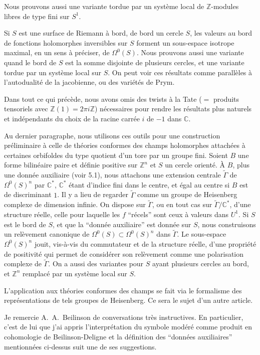 \documentclass[12pt,a4paper]{article}
\theoremstyle{plain}
\theoremstyle{definition}
\theoremstyle{remark}
\newcommand{\Z}{\mathbb{Z}}
\newcommand{\C}{\mathbb{C}}
\begin{document}
Nous prouvons aussi une variante tordue par un système local de $\Z$-modules libres de
type fini sur $S^1$.

Si $S$ est une surface de Riemann à bord, de bord un cercle $S$, les valeurs au bord
de fonctions holomorphes inversibles sur $S$ forment un sous-espace isotrope maximal,
en un sens à préciser, de $\Omega^0(S)$. Nous prouvons aussi une variante quand le bord de $S$
est la somme disjointe de plusieurs cercles, et une variante tordue par un système local
sur $S$. On peut voir ces résultats comme parallèles à l'autodualité de la jacobienne,
ou des variétés de Prym.

Dans tout ce qui précède, nous avons omis des twists à la Tate ($= {}$ produits tensoriels
avec $\Z(1) = 2\pi i\Z$) nécessaires pour rendre les résultats plus naturels et indépendants
du choix de la racine carrée $i$ de $-1$ dans $\C$.

Au dernier paragraphe, nous utilisons ces outils pour une construction préliminaire
à celle de théories conformes des champs holomorphes attachées à certaines orbifoldes
du type quotient d'un tore par un groupe fini. Soient $B$ une forme bilinéaire paire et
définie positive sur $\Z^n$ et $S$ un cercle orienté. À $B$, plus une donnée auxiliaire (voir 5.1),
nous attachons une extension centrale $\tilde{\Gamma}$ de $\Omega^0(S)^n$ par $\C^*$, $\C^*$ étant d'indice fini dans
le centre, et égal au centre si $B$ est de discriminant $1$. Il y a lieu de regarder $\tilde{\Gamma}$ comme
un groupe de Heisenberg complexe de dimension infinie. On dispose sur $\tilde{\Gamma}$, ou en tout
cas sur $\tilde{\Gamma}/\C^*$, d'une structure réelle, celle pour laquelle les $f$ ``récels'' sont ceux à valeurs
dans $U^1$. Si $S$ est le bord de $S$, et que la ``donnée auxiliaire'' est donnée sur $S$, nous
construisons un relèvement canonique de $\Omega^0(S) \subset \Omega^0(S)^n$ dans $\tilde{\Gamma}$. Le sous-espace
$\Omega^0(S)^n$ jouit, vis-à-vis du commutateur et de la structure réelle, d'une propriété de positivité qui permet de considérer son relèvement comme une polarisation complexe de $\tilde{\Gamma}$.
On a aussi des variantes pour $S$ ayant plusieurs cercles au bord, et $\Z^n$ remplacé par un
système local sur $S$.

L'application aux théories conformes des champs se fait via le formalisme des représentations de tels groupes de Heisenberg. Ce sera le sujet d'un autre article.

Je remercie A.~A.~Beilinson de conversations très instructives. En particulier, c'est
de lui que j'ai appris l'interprétation du symbole modéré comme produit en cohomologie
de Beilinson-Deligne et la définition des ``données auxiliaires'' mentionnées ci-dessus suit
une de ses suggestions.
\end{document}
